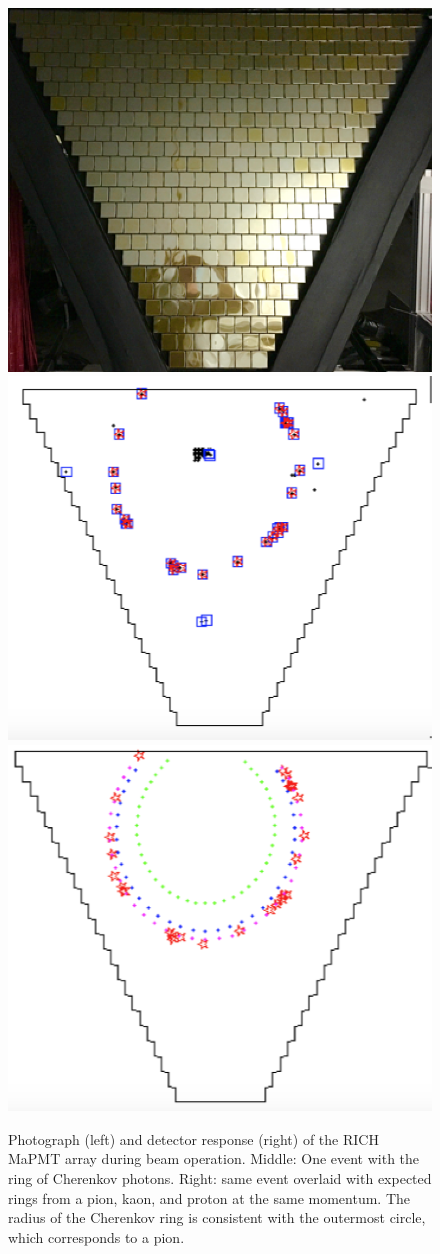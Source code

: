 \documentclass[final,3p,twocolumn]{elsarticle}
\begin{document}
\begin{figure}[ht!]
\centerline{\includegraphics[width=0.625\columnwidth]{rich1.png} 
\includegraphics[width=0.65\columnwidth]{rich2.png}
\includegraphics[width=0.64\columnwidth]{rich3.png} }
\caption{Photograph (left) and detector response (right) of the RICH MaPMT array during beam operation. Middle:
  One event with the ring of Cherenkov photons. Right: same event overlaid with expected rings from a pion, kaon, and
  proton at the same momentum. The radius of the Cherenkov ring is consistent with the outermost circle, which
  corresponds to a pion.}
\label{rich-event}
\end{figure}
\end{document}

